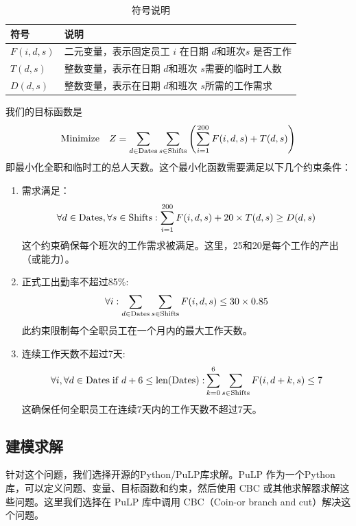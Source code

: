 \documentclass[UTF8,a4paper,10 pt]{article}%
\begin{document}
\begin{table}[!ht]
\caption{符号说明}%
\centering%
\begin{tabular}{p{4cm}<{\centering}p{10cm}<{\centering}}%
\toprule%
符号&说明 \\
\midrule%
$F(i,d,s)$&二元变量，表示固定员工 $i$ 在日期 $d $和班次$ s$ 是否工作\\
$T(d,s)$&整数变量，表示在日期 $d $和班次 $s $需要的临时工人数\\
$D(d,s)$&整数变量，表示在日期 $d $和班次 $s $所需的工作需求\\
\bottomrule%
\end{tabular}
\end{table}
我们的目标函数是
\begin{align*}
    {\rm Minimize}\quad Z =\sum_{d\in {\rm Dates}}\sum_{s\in {\rm Shifts}}\left(\sum_{i = 1}^{200}F(i,d,s)+T(d,s)\right)
\end{align*}
即最小化全职和临时工的总人天数。这个最小化函数需要满足以下几个约束条件：
\begin{enumerate}
    \item 需求满足：\begin{align*}
        \forall d\in {\rm Dates},\forall s\in {\rm Shifts}:\sum_{i = 1}^{200}F(i,d,s)+20\times T(d,s)\geq D(d,s)
    \end{align*}
    这个约束确保每个班次的工作需求被满足。这里，25和20是每个工作的产出（或能力）。
    \item 正式工出勤率不超过85\%: \begin{align*}
        \forall i:\sum_{d\in {\rm Dates}}\sum_{s\in {\rm Shifts}}F(i,d,s)\leq 30 \times 0.85
    \end{align*}此约束限制每个全职员工在一个月内的最大工作天数。
    \item 连续工作天数不超过7天:\begin{align*}
        \forall i,\forall d\in {\rm Dates\; if \;} d+6 \leq{\rm len(Dates):}\sum_{k =0}^6\sum_{s\in {\rm Shifts}}   F(i,d+k,s)\leq 7
    \end{align*}这确保任何全职员工在连续7天内的工作天数不超过7天。
\end{enumerate}

\subsection{建模求解}
针对这个问题，我们选择开源的Python/PuLP库求解。PuLP 作为一个Python库，可以定义问题、变量、目标函数和约束，然后使用 CBC 或其他求解器求解这些问题。这里我们选择在 PuLP 库中调用 CBC（Coin-or branch and cut）解决这个问题。
\end{document}
